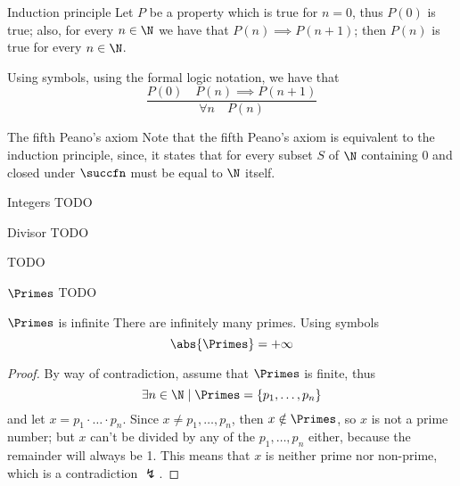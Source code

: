 \documentclass[a4paper, 12pt]{report}
\begin{document}
    \begin{framedprinc}{Induction principle}
        Let $P$ be a property which is true for $n = 0$, thus $P(0)$ is true; also, for every $n \in \N$ we have that $P(n) \implies P(n + 1)$; then $P(n)$ is true for every $n \in \N$.

        Using symbols, using the formal logic notation, we have that $$\dfrac{P(0) \quad P(n) \implies P(n + 1)}{ \forall n \quad P(n )}$$
    \end{framedprinc}

    \begin{framedobs}{The fifth Peano's axiom}
        Note that the fifth Peano's axiom is equivalent to the induction principle, since, it states that for every subset $S$ of $\N$ containing 0 and closed under $\succfn$ must be equal to $\N$ itself.
    \end{framedobs}

    \begin{frameddefn}{Integers}
        TODO
    \end{frameddefn}

    \begin{frameddefn}{Divisor}
        TODO
    \end{frameddefn}

    \begin{example}[Divisors]
        TODO
    \end{example}

    \begin{frameddefn}[label={primes}]{$\Primes$}
        TODO
    \end{frameddefn}

    \begin{framedprop}[label={primes inf}]{$\Primes$ is infinite}
        There are infinitely many primes. Using symbols $$\abs{\Primes} = + \infty$$
    \end{framedprop}

    \begin{proof}
        By way of contradiction, assume that $\Primes$ is finite, thus $$\exists n \in \N \mid \Primes = \{p_1, \ldots, p_n\}$$ and let $x = p_1 \cdot \ldots \cdot p_n$. Since $x \neq p_1, \ldots, p_n$, then $x \notin \Primes$, so $x$ is not a prime number; but $x$ can't be divided by any of the $p_1, \ldots, p_n$ either, because the remainder will always be 1. This means that $x$ is neither prime nor non-prime, which is a contradiction $\lightning$.
    \end{proof}
\end{document}
